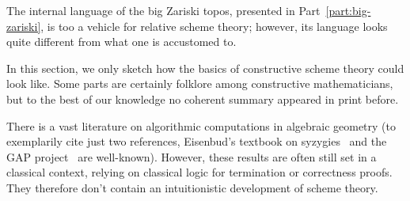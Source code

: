 \documentclass[10pt,reqno,a4paper]{amsbook}
\theoremstyle{definition}
\theoremstyle{plain}
\theoremstyle{remark}
\newcommand{\?}{\,{:}\,}
\renewcommand{\_}{\mathpunct{.}\,}
\begin{document}
The internal language of the big Zariski topos, presented in
Part~\ref{part:big-zariski}, is too a vehicle for relative scheme theory;
however, its language looks quite different from what one is accustomed to.

In this section, we only sketch how the basics of constructive scheme theory
could look like. Some parts are certainly folklore among constructive
mathematicians, but to the best of our knowledge no coherent summary appeared
in print before.

There is a vast literature on algorithmic computations in algebraic geometry
(to exemplarily cite just two references, Eisenbud's textbook on
syzygies~\cite{eisenbud:syzygies} and the GAP project~\cite{gap} are
well-known). However, these results are often still set in a classical context,
relying on classical logic for termination or correctness proofs. They
therefore don't contain an intuitionistic development of scheme theory.
\end{document}
